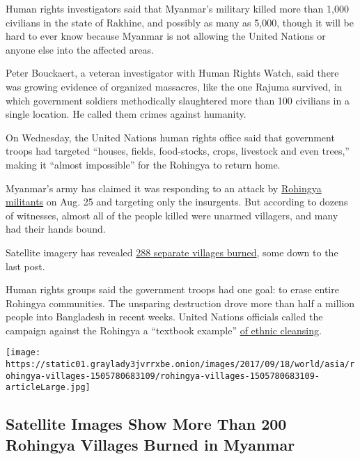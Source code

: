 Human rights investigators said that Myanmar's military killed more than
1,000 civilians in the state of Rakhine, and possibly as many as 5,000,
though it will be hard to ever know because Myanmar is not allowing the
United Nations or anyone else into the affected areas.

Peter Bouckaert, a veteran investigator with Human Rights Watch, said
there was growing evidence of organized massacres, like the one Rajuma
survived, in which government soldiers methodically slaughtered more
than 100 civilians in a single location. He called them crimes against
humanity.

On Wednesday, the United Nations human rights office said that
government troops had targeted ``houses, fields, food-stocks, crops,
livestock and even trees,'' making it ``almost impossible'' for the
Rohingya to return home.

Myanmar's army has claimed it was responding to an attack by
\href{https://www.nytimes3xbfgragh.onion/2017/09/17/world/asia/myanmar-rohingya-militants.html}{Rohingya
militants} on Aug. 25 and targeting only the insurgents. But according
to dozens of witnesses, almost all of the people killed were unarmed
villagers, and many had their hands bound.

Satellite imagery has revealed
\href{https://www.nytimes3xbfgragh.onion/interactive/2017/09/18/world/asia/rohingya-villages.html}{288
separate villages burned}, some down to the last post.

Human rights groups said the government troops had one goal: to erase
entire Rohingya communities. The unsparing destruction drove more than
half a million people into Bangladesh in recent weeks. United Nations
officials called the campaign against the Rohingya a ``textbook
example''
\href{https://www.nytimes3xbfgragh.onion/2017/09/11/world/asia/myanmar-rohingya-ethnic-cleansing.html}{of
ethnic cleansing}.

\href{https://www.nytimes3xbfgragh.onion/interactive/2017/09/18/world/asia/rohingya-villages.html}{}

\texttt{[image: https://static01.graylady3jvrrxbe.onion/images/2017/09/18/world/asia/rohingya-villages-1505780683109/rohingya-villages-1505780683109-articleLarge.jpg]}

\hypertarget{satellite-images-show-more-than-200-rohingya-villages-burned-in-myanmar}{%
\subsection{Satellite Images Show More Than 200 Rohingya Villages Burned
in
Myanmar}\label{satellite-images-show-more-than-200-rohingya-villages-burned-in-myanmar}}

